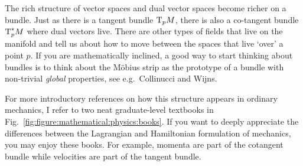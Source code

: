\documentclass[12pt, oneside]{report}    %
\begin{document}
The rich structure of vector spaces and dual vector spaces become richer on a bundle. Just as there is a tangent bundle $\textnormal{T}_pM$, there is also a co-tangent bundle $\textnormal{T}^*_pM$ where dual vectors live. There are other types of fields that live on the manifold and tell us about how to move between the spaces that live `over' a point $p$. If you are mathematically inclined, a good way to start thinking about bundles is to think about the M\"obius strip as the prototype of a bundle with non-trivial \emph{global} properties, see e.g.\ Collinucci and Wijns\autocite{Collinucci:2006hx}.

For more introductory references on how this structure appears in ordinary mechanics, I refer to two neat graduate-level textbooks in Fig.~\ref{fig:figure:mathematical:physics:books}. If you want to deeply appreciate the differences between the Lagrangian and Hamiltonian formulation of mechanics, you may enjoy these books. For example, momenta are part of the cotangent bundle while velocities are part of the tangent bundle. 
\end{document}

